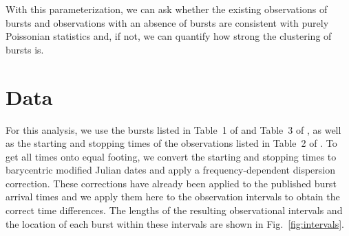 \documentclass[fleqn,usenatbib]{mnras}
\begin{document}
With this parameterization, we can ask whether the existing observations of bursts and observations with an absence of bursts are consistent with purely Poissonian statistics and, if not, we can quantify how strong the clustering of bursts is.


\section{Data}
\label{sec:data}


For this analysis, we use the bursts listed in Table~1 of \citet{spitler-2016} and Table~3 of \citet{scholz-2016}, as well as the starting and stopping times of the observations listed in Table~2 of \citet{scholz-2016}. To get all times onto equal footing, we convert the starting and stopping times to barycentric modified Julian dates and apply a frequency-dependent dispersion correction. These corrections have already been applied to the published burst arrival times and we apply them here to the observation intervals to obtain the correct time differences. The lengths of the resulting observational intervals and the location of each burst within these intervals are shown in Fig.~\ref{fig:intervals}.
\end{document}
